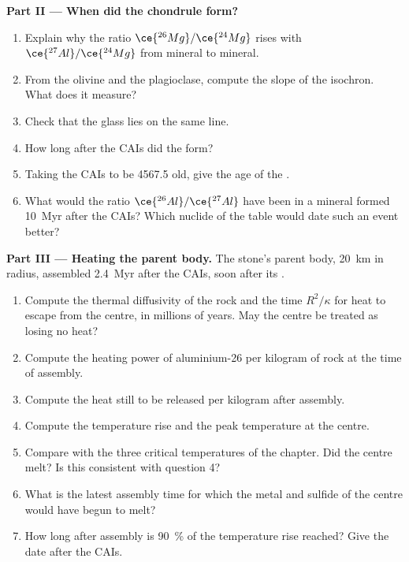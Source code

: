 \begin{problem}
\noindent\textbf{Part II --- When did the chondrule form?}
\begin{enumerate}[resume]
  \item Explain why the ratio $\ce{^{26}Mg}/\ce{^{24}Mg}$ rises with
        $\ce{^{27}Al}/\ce{^{24}Mg}$ from mineral to mineral.
  \item From the olivine and the plagioclase, compute the slope of the isochron.
        What does it measure?
  \item Check that the glass lies on the same line.
  \item How long after the CAIs did the  form?
  \item Taking the CAIs to be \qty{4567.5}{\Ma} old, give the age of the .
  \item What would the ratio $\ce{^{26}Al}/\ce{^{27}Al}$ have been in a mineral formed
        \qty{10}{Myr} after the CAIs? Which nuclide of the table would date such an
        event better?
\end{enumerate}

\noindent\textbf{Part III --- Heating the parent body.}
The stone's parent body, \qty{20}{km} in radius, assembled \qty{2.4}{Myr} after
the CAIs, soon after its .
\begin{enumerate}[resume]
  \item Compute the thermal diffusivity of the rock and the time $R^2/\kappa$ for
        heat to escape from the centre, in millions of years. May the centre be
        treated as losing no heat?
  \item Compute the heating power of aluminium-26 per kilogram of rock at the time
        of assembly.
  \item Compute the heat still to be released per kilogram after assembly.
  \item Compute the temperature rise and the peak temperature at the centre.
  \item Compare with the three critical temperatures of the chapter. Did the
        centre melt? Is this consistent with question 4?
  \item What is the latest assembly time for which the metal and sulfide of the
        centre would have begun to melt?
  \item How long after assembly is \qty{90}{\percent} of the temperature rise
        reached? Give the date after the CAIs.
\end{enumerate}


\end{problem}
